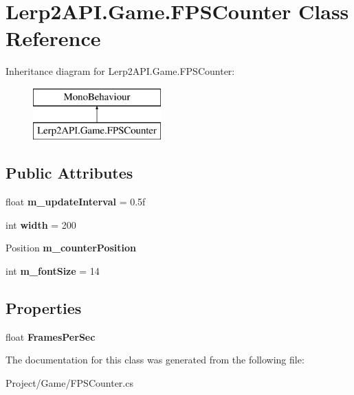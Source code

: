 \hypertarget{class_lerp2_a_p_i_1_1_game_1_1_f_p_s_counter}{}\section{Lerp2\+A\+P\+I.\+Game.\+F\+P\+S\+Counter Class Reference}
\label{class_lerp2_a_p_i_1_1_game_1_1_f_p_s_counter}
Inheritance diagram for Lerp2\+A\+P\+I.\+Game.\+F\+P\+S\+Counter\+:\begin{figure}[H]
\begin{center}
\leavevmode
\includegraphics[height=2.000000cm]{class_lerp2_a_p_i_1_1_game_1_1_f_p_s_counter}
\end{center}
\end{figure}
\subsection*{Public Attributes}
\begin{DoxyCompactItemize}
\item 
\mbox{\label{class_lerp2_a_p_i_1_1_game_1_1_f_p_s_counter_af56f602b2a2d60d61598b4f99037071d}} 
float {\bfseries m\+\_\+update\+Interval} = 0.\+5f
\item 
\mbox{\label{class_lerp2_a_p_i_1_1_game_1_1_f_p_s_counter_a3c4912e96145faa7da3def885d1e228a}} 
int {\bfseries width} = 200
\item 
\mbox{\label{class_lerp2_a_p_i_1_1_game_1_1_f_p_s_counter_a025577891ecddb9022e29fd461b5abec}} 
Position {\bfseries m\+\_\+counter\+Position}
\item 
\mbox{\label{class_lerp2_a_p_i_1_1_game_1_1_f_p_s_counter_a639d33c87a08a7b78b6bc913dcf44b47}} 
int {\bfseries m\+\_\+font\+Size} = 14
\end{DoxyCompactItemize}
\subsection*{Properties}
\begin{DoxyCompactItemize}
\item 
\mbox{\label{class_lerp2_a_p_i_1_1_game_1_1_f_p_s_counter_ac04fcbbbae098f3edcf98aa3ab035406}} 
float {\bfseries Frames\+Per\+Sec}
\end{DoxyCompactItemize}


The documentation for this class was generated from the following file\+:\begin{DoxyCompactItemize}
\item 
Project/\+Game/F\+P\+S\+Counter.\+cs\end{DoxyCompactItemize}
